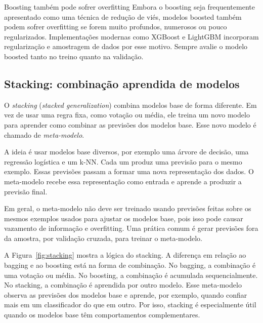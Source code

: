 \documentclass[12pt,a4paper]{article}
\begin{document}
\begin{alertabox}{Boosting também pode sofrer overfitting}
Embora o boosting seja frequentemente apresentado como uma técnica de redução de viés, modelos boosted também podem sofrer overfitting se forem muito profundos, numerosos ou pouco regularizados. Implementações modernas como XGBoost e LightGBM incorporam regularização e amostragem de dados por esse motivo. Sempre avalie o modelo boosted tanto no treino quanto na validação.
\end{alertabox}

\subsection{Stacking: combinação aprendida de modelos}

O \emph{stacking} (\textit{stacked generalization}) combina modelos base de forma diferente. Em vez de usar uma regra fixa, como votação ou média, ele treina um novo modelo para aprender como combinar as previsões dos modelos base. Esse novo modelo é chamado de \emph{meta-modelo}.

A ideia é usar modelos base diversos, por exemplo uma árvore de decisão, uma regressão logística e um k-NN. Cada um produz uma previsão para o mesmo exemplo. Essas previsões passam a formar uma nova representação dos dados. O meta-modelo recebe essa representação como entrada e aprende a produzir a previsão final.

Em geral, o meta-modelo não deve ser treinado usando previsões feitas sobre os mesmos exemplos usados para ajustar os modelos base, pois isso pode causar vazamento de informação e overfitting. Uma prática comum é gerar previsões fora da amostra, por validação cruzada, para treinar o meta-modelo.

A Figura~\ref{fig:stacking} mostra a lógica do stacking. A diferença em relação ao bagging e ao boosting está na forma de combinação. No bagging, a combinação é uma votação ou média. No boosting, a combinação é acumulada sequencialmente. No stacking, a combinação é aprendida por outro modelo. Esse meta-modelo observa as previsões dos modelos base e aprende, por exemplo, quando confiar mais em um
classificador do que em outro. Por isso, stacking é especialmente útil quando os modelos base têm comportamentos complementares.
\end{document}
